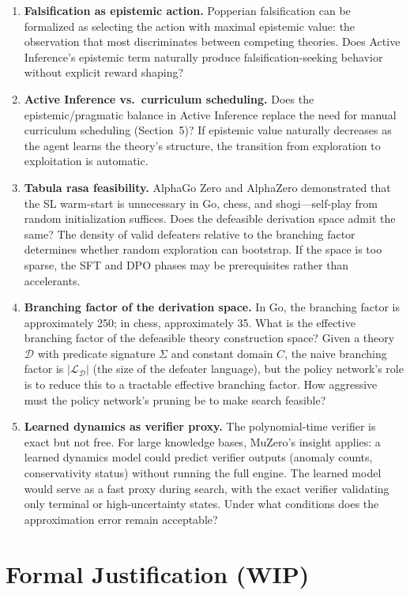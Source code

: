 \documentclass[11pt]{article}
\newcommand{\D}{\mathcal{D}}
\begin{document}
\begin{enumerate}
    \item \textbf{Falsification as epistemic action.} Popperian falsification can be formalized as selecting the action with maximal epistemic value: the observation that most discriminates between competing theories. Does Active Inference's epistemic term naturally produce falsification-seeking behavior without explicit reward shaping?
    \item \textbf{Active Inference vs.\ curriculum scheduling.} Does the epistemic/pragmatic balance in Active Inference replace the need for manual curriculum scheduling (Section~5)? If epistemic value naturally decreases as the agent learns the theory's structure, the transition from exploration to exploitation is automatic.
    \item \textbf{Tabula rasa feasibility.} AlphaGo Zero and AlphaZero demonstrated that the SL warm-start is unnecessary in Go, chess, and shogi---self-play from random initialization suffices. Does the defeasible derivation space admit the same? The density of valid defeaters relative to the branching factor determines whether random exploration can bootstrap. If the space is too sparse, the SFT and DPO phases may be prerequisites rather than accelerants.
    \item \textbf{Branching factor of the derivation space.} In Go, the branching factor is approximately 250; in chess, approximately 35. What is the effective branching factor of the defeasible theory construction space? Given a theory $\D$ with predicate signature $\Sigma$ and constant domain $C$, the naive branching factor is $|\mathcal{L}_\D|$ (the size of the defeater language), but the policy network's role is to reduce this to a tractable effective branching factor. How aggressive must the policy network's pruning be to make search feasible?
    \item \textbf{Learned dynamics as verifier proxy.} The polynomial-time verifier is exact but not free. For large knowledge bases, MuZero's insight applies: a learned dynamics model could predict verifier outputs (anomaly counts, conservativity status) without running the full engine. The learned model would serve as a fast proxy during search, with the exact verifier validating only terminal or high-uncertainty states. Under what conditions does the approximation error remain acceptable?
\end{enumerate}

\section{Formal Justification (WIP)}
 
\end{document}
